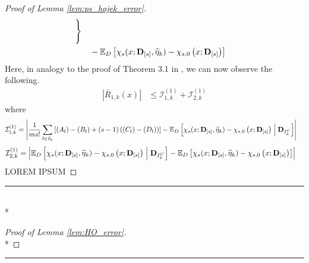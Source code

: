 \begin{proof}[Proof of Lemma \ref{lem:ps_hajek_error}]
\begin{equation}
\begin{aligned}
            \Bigg\} \\
            & \quad - \mathbb{E}_{D}\left[\chi_{s}(x; \mathbf{D}_{[s]}, \widehat{\eta}_{k}) - \chi_{s,0}\left(x; \mathbf{D}_{[s]}\right)\right]
        \end{aligned}
    \end{equation}
    Here, in analogy to the proof of Theorem 3.1 in \citet{chernozhukov_doubledebiased_2018}, we can now observe the following.
    \begin{equation}
        \begin{aligned}
            \left|\bar{R}_{1, k}\left(x\right)\right|
            & \leq \mathcal{I}_{1,k}^{(1)} + \mathcal{I}_{2,k}^{(1)}
        \end{aligned}
    \end{equation}
    where
    \begin{equation}
        \begin{aligned}
            \mathcal{I}_{1,k}^{(1)} 
            & = \left|
            \frac{1}{m s!}\sum_{l \in I_{k}}\left[(A_{l}) - (B_{l}) + (s-1)\left((C_{l}) - (D_{l})\right)\right]
            - \mathbb{E}_{D}\left[\chi_{s}(x; \mathbf{D}_{[s]}, \widehat{\eta}_{k}) - \chi_{s,0}\left(x; \mathbf{D}_{[s]}\right) \; \middle| \; \mathbf{D}_{I_{k}^{C}}\right]\right|
        \end{aligned}
    \end{equation}
    \begin{equation}
        \begin{aligned}
            \mathcal{I}_{2,k}^{(1)} 
            & = \left|\mathbb{E}_{D}\left[\chi_{s}(x; \mathbf{D}_{[s]}, \widehat{\eta}_{k}) - \chi_{s,0}\left(x; \mathbf{D}_{[s]}\right) \; \middle| \; \mathbf{D}_{I_{k}^{C}}\right]
            - \mathbb{E}_{D}\left[\chi_{s}(x; \mathbf{D}_{[s]}, \widehat{\eta}_{k}) - \chi_{s,0}\left(x; \mathbf{D}_{[s]}\right)\right]\right|
        \end{aligned}
    \end{equation}
{\color{red} LOREM IPSUM}
\end{proof}

\hrule

\begin{lem}\label{lem:HO_error}\mbox{}\\*
    
\end{lem}

\begin{proof}[Proof of Lemma \ref{lem:HO_error}]\mbox{}\\*
    
\end{proof}

\hrule